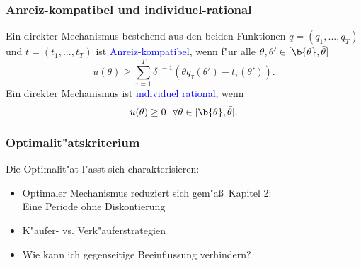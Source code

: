 \begin{frame}
\frametitle{Anreiz-kompatibel und individuel-rational}
\justifying
\begin{thmD}
  Ein direkter Mechanismus bestehend aus den beiden Funktionen $q=(q_{1},...,q_{T})$ und $t = (t_{1}, ..., t_{T})$ ist \textcolor{blue}{Anreiz-kompatibel}, wenn f"ur alle $\theta,\theta' \in [ \b{\theta} , \bar{\theta} ]$
  \begin{equation*}
    u(\theta) \geq \sum_{\tau=1}^{T} \delta^{\tau -1} (\theta q_\tau(\theta') - t_\tau(\theta')).
  \end{equation*}
  Ein direkter Mechanismus ist \textcolor{blue}{individuel rational}, wenn
  \begin{equation*}
    u(\theta) \ge 0 \ \ \forall \theta \in [ \b{\theta} , \bar{\theta} ].
  \end{equation*}
\end{thmD}
\end{frame}

\begin{frame}
\frametitle{Optimalit"atskriterium}
\justifying
Die Optimalit"at l"asst sich charakterisieren:
\begin{itemize}
  \item Optimaler Mechanismus reduziert sich gem"a\ss \ Kapitel 2: \\ Eine Periode ohne Diskontierung
  \item K"aufer- vs. Verk"auferstrategien
  \item Wie kann ich gegenseitige Beeinflussung verhindern?
\end{itemize}
\end{frame}

